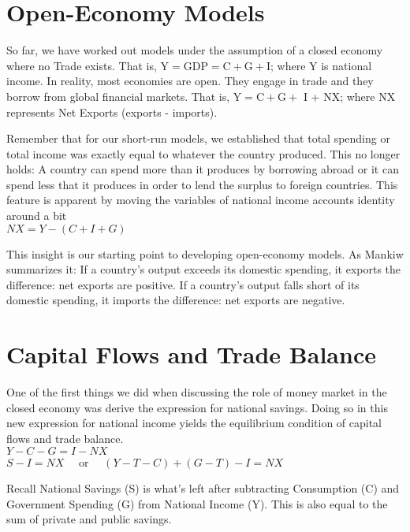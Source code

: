 \documentclass[10pt]{article}
\begin{document}
\section*{Open-Economy Models}
So far, we have worked out models under the assumption of a closed economy where no Trade exists. That is, $\mathrm{Y}=\mathrm{GDP}=\mathrm{C}+\mathrm{G}+\mathrm{I}$; where Y is national income. In reality, most economies are open. They engage in trade and they borrow from global financial markets. That is, $\mathrm{Y}=\mathrm{C}+\mathrm{G}+$ I + NX; where NX represents Net Exports (exports - imports).

Remember that for our short-run models, we established that total spending or total income was exactly equal to whatever the country produced. This no longer holds: A country can spend more than it produces by borrowing abroad or it can spend less that it produces in order to lend the surplus to foreign countries. This feature is apparent by moving the variables of national income accounts identity around a bit\\
$N X=Y-(C+I+G)$

This insight is our starting point to developing open-economy models. As Mankiw summarizes it: If a country's output exceeds its domestic spending, it exports the difference: net exports are positive. If a country's output falls short of its domestic spending, it imports the difference: net exports are negative.

\section*{Capital Flows and Trade Balance}
One of the first things we did when discussing the role of money market in the closed economy was derive the expression for national savings. Doing so in this new expression for national income yields the equilibrium condition of capital flows and trade balance.\\
$Y-C-G=I-N X$\\
$S-I=N X \quad$ or $\quad(Y-T-C)+(G-T)-I=N X$

Recall National Savings (S) is what's left after subtracting Consumption (C) and Government Spending (G) from National Income (Y). This is also equal to the sum of private and public savings.
\end{document}
